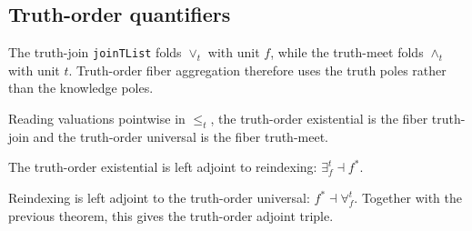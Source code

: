 \subsection{Truth-order quantifiers}

\begin{proposition}\label{thm:charge-joinTList}\leanok{}
The truth-join \texttt{joinTList} folds $\vee_t$ with unit $f$, while the
truth-meet folds $\wedge_t$ with unit $t$. Truth-order fiber aggregation
therefore uses the truth poles rather than the knowledge poles.
\end{proposition}

\begin{proposition}\label{thm:existsT}\leanok{}
Reading valuations pointwise in $\le_t$, the truth-order existential is the
fiber truth-join and the truth-order universal is the fiber truth-meet.
\end{proposition}

\begin{theorem}\label{thm:existsT-adjunction}\leanok{}
The truth-order existential is left adjoint to reindexing:
$\exists^t_f \dashv f^*$.
\end{theorem}

\begin{theorem}\label{thm:forallT-adjunction}\leanok{}
Reindexing is left adjoint to the truth-order universal:
$f^* \dashv \forall^t_f$. Together with the previous theorem, this gives the
truth-order adjoint triple.
\end{theorem}
